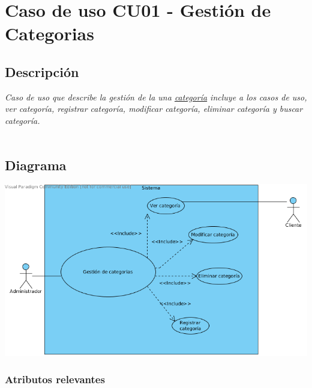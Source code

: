 \newpage
		\hypertarget{Gestion de Categorias}{}
		\section{\textbf{Caso de uso CU01 - Gesti\'on de Categorias}}

			\subsection{Descripci\'on}
				\textsl{Caso de uso que describe la gesti\'on de la una \hyperlink{Categoria}{categor\'ia} incluye a los casos de uso, ver categor\'ia, registrar categor\'ia, modificar categor\'ia, eliminar categor\'ia y buscar categor\'ia. \\ \\}
			\subsection{Diagrama}
				\includegraphics[scale=0.9]{images/casos/gestionCategoria.png}
				
			\subsubsection{ \textbf{Atributos relevantes} }

